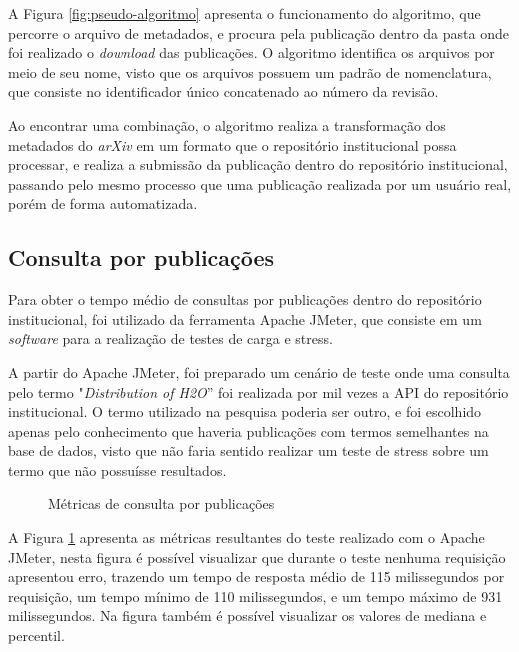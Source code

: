 A Figura \ref{fig:pseudo-algoritmo} apresenta o funcionamento do algoritmo, que percorre o arquivo
de metadados, e procura pela publicação dentro da pasta onde foi realizado o \emph{download} das publicações.
O algoritmo identifica os arquivos por meio de seu nome, visto que os arquivos possuem um padrão de nomenclatura,
que consiste no identificador único concatenado ao número da revisão.

Ao encontrar uma combinação, o algoritmo realiza a transformação dos metadados do
\emph{arXiv} em um formato que o repositório institucional possa processar, e realiza
a submissão da publicação dentro do repositório institucional, passando pelo mesmo
processo que uma publicação realizada por um usuário real, porém de forma automatizada.

\subsection{Consulta por publicações}

Para obter o tempo médio de consultas por publicações dentro do repositório
institucional, foi utilizado da ferramenta Apache JMeter, que consiste em um
\emph{software} para a realização de testes de carga e stress.

A partir do Apache JMeter, foi preparado um cenário de teste onde uma consulta
pelo termo "\emph{Distribution of H2O}'' foi realizada por mil vezes a API do
repositório institucional. O termo utilizado na pesquisa poderia ser outro, e
foi escolhido apenas pelo conhecimento que haveria publicações com termos semelhantes
na base de dados, visto que não faria sentido realizar um teste de stress sobre um termo
que não possuísse resultados.

\begin{figure}[H]
    \caption{Métricas de consulta por publicações}
    \label{fig:matrics-advanced-search}
\end{figure}

A Figura \ref{fig:matrics-advanced-search} apresenta as métricas resultantes do teste
realizado com o Apache JMeter, nesta figura é possível visualizar que durante o teste
nenhuma requisição apresentou erro, trazendo um tempo de resposta médio de 115 milissegundos
por requisição, um tempo mínimo de 110 milissegundos, e um tempo máximo de 931 milissegundos.
Na figura também é possível visualizar os valores de mediana e percentil.

